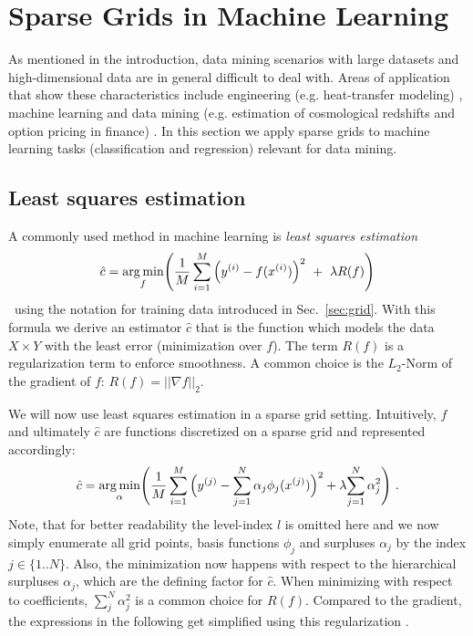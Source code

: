 \section{Sparse Grids in Machine Learning}

As mentioned in the introduction, data mining scenarios with large datasets
and high-dimensional data are in general difficult to deal with.
Areas of application
that show these characteristics include engineering (e.g. heat-transfer
modeling) \cite{disspeh},
machine learning and data mining (e.g. estimation of cosmological redshifts
and option pricing in finance) \cite{disspfl}. In this section
we apply sparse grids to machine learning tasks
(classification and regression) relevant for data mining.
\par
\subsection{Least squares estimation}
A commonly used method in machine learning is \emph{least squares estimation}
$$\hat{c} = \underset{f}{\text{arg \hspace{-0.5mm}min}}\Bigg(\frac{1}{M}\sum\limits_{i = 1}^{M}{\Big(y^{(i)} - f(x^{(i)})\Big)^2 \ + \ \lambda R(f)} \Bigg)$$ \
using the notation for training data 
introduced in Sec.~\ref{sec:grid}. With this formula we
derive an estimator $\hat{c}$ that is the function which models the
data $X \times Y$ with the least error (minimization over $f$).
The term $R(f)$ is a regularization term to enforce smoothness. A common choice
is the $L_2$-Norm of the gradient of $f$: $R(f) = ||\nabla f||_2$.
\par
We will now use least squares estimation in a sparse grid setting. Intuitively,
$f$ and ultimately $\hat{c}$
 are functions discretized on a sparse grid and represented
accordingly:
$$\hat{c} = \underset{{\alpha}}{\text{arg \hspace{-0.5mm}min}}\Bigg(\frac{1}{M}
\sum\limits_{i = 1}^{M}{\Big(y^{(j)} - {\sum_{j=1}^N{\alpha_j}\phi_j(x^{(j)})}\Big)^2 +
  \lambda {\sum_{j=1}^N{\alpha_j^2}}}\color{black} \Bigg) \ .$$
Note, that for better readability the level-index $l$ is omitted here and
we now simply enumerate all grid points, basis functions $\phi_j$ and surpluses
$\alpha_j$
 by the index $j \in \{1..N\}$.
Also, the minimization now happens with
respect to the hierarchical surpluses $\alpha_j$,
which are the defining factor for $\hat{c}$.
When minimizing with respect to coefficients, $\sum_j^N{\alpha_j^2}$
is a common choice for
$R(f)$. Compared to the gradient, the
expressions in the following get simplified using this regularization
\cite{disspfl}.
